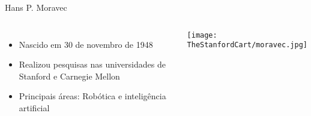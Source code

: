 \begin{frame}[t]{ Hans P. Moravec}
    \begin{columns}
        \begin{itemize} 
            \item Nascido em 30 de novembro de 1948
            \item Realizou pesquisas nas universidades de Stanford e Carnegie Mellon
            \item Principais áreas: Robótica e inteligência artificial
        \end{itemize}
            \centering
            \vspace*{0.8cm}
            \texttt{[image: TheStanfordCart/moravec.jpg]}
        \end{columns}
\end{frame}

